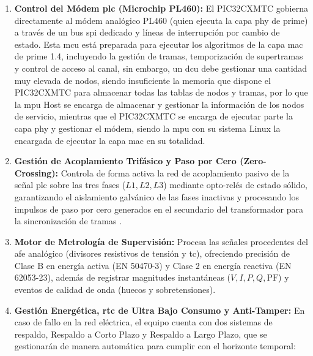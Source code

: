 \begin{enumerate}
    \item \textbf{Control del Módem \gls{plc} (Microchip PL460):} El PIC32CXMTC gobierna directamente al módem analógico PL460 (quien ejecuta la capa \gls{phy} de \gls{prime}) a través de un bus \gls{spi} dedicado y líneas de interrupción por cambio de estado. Esta \gls{mcu} está preparada para ejecutar los algoritmos de la capa \gls{mac} de \gls{prime} 1.4, incluyendo la gestión de tramas, temporización de supertramas y control de acceso al canal, sin embargo, un \gls{dcu} debe gestionar una cantidad muy elevada de nodos, siendo insuficiente la memoria que dispone el PIC32CXMTC para almacenar todas las tablas de nodos y tramas, por lo que la \gls{mpu} Host se encarga de almacenar y gestionar la información de los nodos de servicio, mientras que el PIC32CXMTC se encarga de ejecutar parte la capa \gls{phy} y gestionar el módem, siendo la \gls{mpu} con su sistema Linux la encargada de ejecutar la capa \gls{mac} en su totalidad.
    
    \item \textbf{Gestión de Acoplamiento Trifásico y Paso por Cero (Zero-Crossing):} Controla de forma activa la red de acoplamiento pasivo de la señal \gls{plc} sobre las tres fases ($L1, L2, L3$) mediante opto-relés de estado sólido, garantizando el aislamiento galvánico de las fases inactivas y procesando los impulsos de paso por cero generados en el secundario del transformador para la sincronización de tramas \cite{5764420}.

    \item \textbf{Motor de Metrología de Supervisión:} Procesa las señales procedentes del \gls{afe} analógico (divisores resistivos de tensión y \gls{tc}), ofreciendo precisión de Clase B en energía activa (EN 50470-3) y Clase 2 en energía reactiva (EN 62053-23), además de registrar magnitudes instantáneas ($V, I, P, Q, \text{PF}$) y eventos de calidad de onda (huecos y sobretensiones).

    \item \textbf{Gestión Energética, \gls{rtc} de Ultra Bajo Consumo y Anti-Tamper:} 
    En caso de fallo en la red eléctrica, el equipo cuenta con dos sistemas de respaldo, Respaldo a Corto Plazo y Respaldo a Largo Plazo, que se gestionarán de manera automática para cumplir con el horizonte temporal: %


\end{enumerate}

